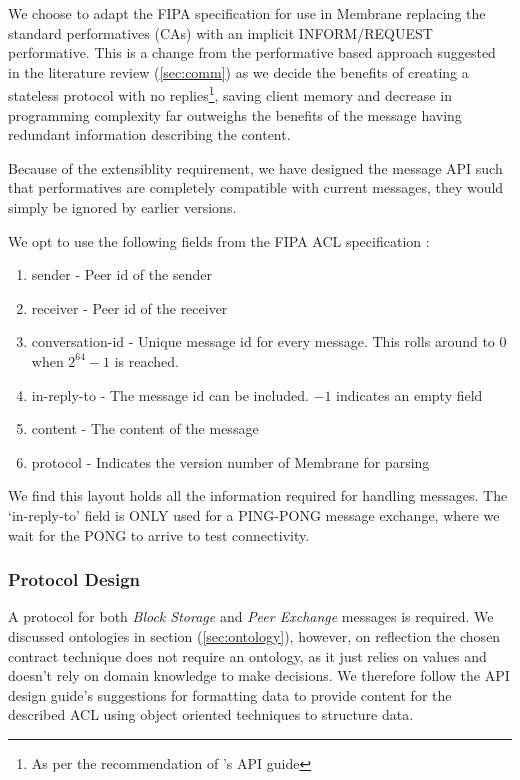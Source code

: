\documentclass[11pt, a4paper, twoside]{report}
\begin{document}
We choose to adapt the FIPA specification for use in Membrane replacing the standard performatives (CAs) with an implicit INFORM/REQUEST performative. This is a change from the performative based approach suggested in the literature review (\ref{sec:comm}) as we decide the benefits of creating a stateless protocol with no replies\footnote{As per the recommendation of \citep{google2017api}'s API guide}, saving client memory and decrease in programming complexity far outweighs the benefits of the message having redundant information describing the content.

Because of the extensiblity requirement, we have designed the message API such that performatives are completely compatible with current messages, they would simply be ignored by earlier versions.

We opt to use the following fields from the FIPA ACL specification \citep{fipa2002fipa}:

\begin{enumerate}
 \item sender - Peer id of the sender
 \item receiver - Peer id of the receiver
 \item conversation-id - Unique message id for every message. This rolls around to $0$ when $2^{64}-1$ is reached.
 \item in-reply-to - The message id can be included. $-1$ indicates an empty field
 \item content - The content of the message
 \item protocol - Indicates the version number of Membrane for parsing
\end{enumerate}

We find this layout holds all the information required for handling messages. The `in-reply-to' field is ONLY used for a PING-PONG message exchange, where we wait for the PONG to arrive to test connectivity.

\subsubsection{Protocol Design}

A protocol for both \emph{Block Storage} and \emph{Peer Exchange} messages is required. We discussed ontologies in section (\ref{sec:ontology}), however, on reflection the chosen contract technique does not require an ontology, as it just relies on values and doesn't rely on domain knowledge to make decisions. We therefore follow the API design guide's suggestions for formatting data to provide content for the described ACL using object oriented techniques to structure data.
\end{document}
